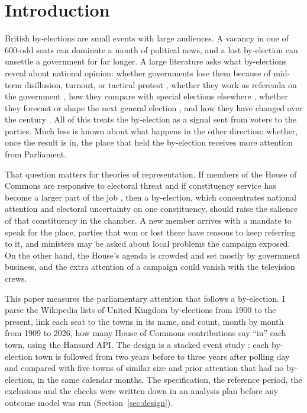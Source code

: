 \documentclass[11pt,a4paper]{article}
\begin{document}
\section{Introduction}
British by-elections are small events with large audiences. A vacancy in one of 600-odd seats can dominate a month of political news, and a lost by-election can unsettle a government for far longer. A large literature asks what by-elections reveal about national opinion: whether governments lose them because of mid-term disillusion, turnout, or tactical protest \citep{mughan1986,mughan1988,price1998}, whether they work as referenda on the government \citep{feigert1990}, how they compare with special elections elsewhere \citep{studlar1987,loewen2010}, whether they forecast or shape the next general election \citep{upton1991,hanretty2021}, and how they have changed over the century \citep{pollock1941,norris1990,cook1997}. All of this treats the by-election as a signal sent from voters to the parties. Much less is known about what happens in the other direction: whether, once the result is in, the place that held the by-election receives more attention from Parliament.

That question matters for theories of representation. If members of the House of Commons are responsive to electoral threat \citep{andre2015,kellermann2016} and if constituency service has become a larger part of the job \citep{cain1987,norton1993,norton1994}, then a by-election, which concentrates national attention and electoral uncertainty on one constituency, should raise the salience of that constituency in the chamber. A new member arrives with a mandate to speak for the place, parties that won or lost there have reasons to keep referring to it, and ministers may be asked about local problems the campaign exposed. On the other hand, the House's agenda is crowded and set mostly by government business, and the extra attention of a campaign could vanish with the television crews.

This paper measures the parliamentary attention that follows a by-election. I parse the Wikipedia lists of United Kingdom by-elections from 1900 to the present, link each seat to the towns in its name, and count, month by month from 1909 to 2026, how many House of Commons contributions say ``in'' each town, using the Hansard API. The design is a stacked event study \citep{cengiz2019}: each by-election town is followed from two years before to three years after polling day and compared with five towns of similar size and prior attention that had no by-election, in the same calendar months. The specification, the reference period, the exclusions and the checks were written down in an analysis plan before any outcome model was run (Section~\ref{sec:design}).
\end{document}
